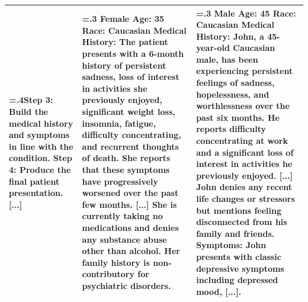 \documentclass[11pt]{article}
\begin{document}
\begin{table}[htbp]
\begin{tabularx}{\textwidth}{@{} >{\hsize=.4\hsize}X >{\hsize=.3\hsize}X >{\hsize=.3\hsize}X @{}}
        Step 3: Build the medical history and symptoms in line with the condition. \newline
        Step 4: Produce the final patient presentation. [...]
        &
        Female \newline
        Age: 35 \newline
        Race: Caucasian \newline
        \vspace{1mm} \newline
        Medical History: The patient presents with a 6-month history of persistent sadness, loss of interest in activities she previously enjoyed, significant weight loss, insomnia, fatigue, difficulty concentrating, and recurrent thoughts of death. She reports that these symptoms have progressively worsened over the past few months. [...] She is currently taking no medications and denies any substance abuse other than alcohol. Her family history is non-contributory for psychiatric disorders.
        &
        Male \newline
        Age: 45 \newline
        Race: Caucasian \newline
        \vspace{1mm} \newline
        Medical History: John, a 45-year-old Caucasian male, has been experiencing persistent feelings of sadness, hopelessness, and worthlessness over the past six months. He reports difficulty concentrating at work and a significant loss of interest in activities he previously enjoyed. [...] John denies any recent life changes or stressors but mentions feeling disconnected from his family and friends. \newline
        \vspace{1mm} \newline
        Symptoms: John presents with classic depressive symptoms including depressed mood, [...]. \\
        \bottomrule
    \end{tabularx}
\end{table}

\clearpage
\twocolumn
\normalsize
\end{document}
